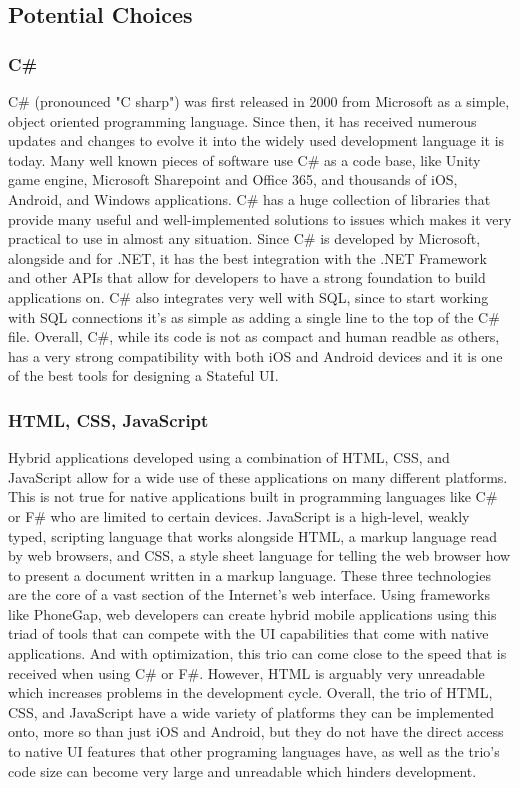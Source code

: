 \documentclass[onecolumn, draftclsnofoot,10pt, compsoc]{IEEEtran}
\begin{document}
\begin{singlespace}
\subsection{Potential Choices}
\subsubsection{C\#}
C\# (pronounced "C sharp") was first released in 2000 from Microsoft as a simple, object oriented programming language. Since then, it has received numerous updates
and changes to evolve it into the widely used development language it is today. Many well known pieces of software use C\# as a code base, like Unity game engine, Microsoft Sharepoint and Office 365,
and thousands of iOS, Android, and Windows applications. C\# has a huge collection of libraries that provide many useful and well-implemented solutions to issues which makes it very practical to use
in almost any situation. Since C\# is developed by Microsoft, alongside and for .NET, it has the best integration with the .NET Framework and other APIs that allow for developers to have a strong 
foundation to build applications on. C\# also integrates very well with SQL, since to start working with SQL connections it's as simple as adding a single line to the top of the C\# file. Overall, C\#,
while its code is  not as compact and human readble as others, has a very strong compatibility with both iOS and Android devices and it is one of the  best tools for designing a Stateful UI.

\subsubsection{HTML, CSS, JavaScript}
Hybrid applications developed using a combination of HTML, CSS, and JavaScript allow for a wide use of these applications on many different platforms. This is not true for native applications built in
programming languages like C\# or F\# who are limited to certain devices. JavaScript is a high-level, weakly typed, scripting language that works alongside HTML, a markup language read by web browsers, and CSS, a style sheet language
for telling the web browser how to present a document written in a markup language. These three technologies are the core of a vast section of the Internet's web interface. Using frameworks like 
PhoneGap, web developers can create hybrid mobile applications using this triad of tools that can compete with the UI capabilities that come with native applications. And with optimization, this trio 
can come close to the speed that is received when using C\# or F\#. However, HTML is arguably very unreadable which increases problems in the development cycle. Overall, the trio of  HTML, CSS, and JavaScript
have a wide variety of platforms they can be implemented onto, more so than just iOS and Android, but they do not have the direct access to native UI features that other programing languages have, as well
as the trio's code size can become very large and unreadable which hinders development.


\end{singlespace}
\end{document}
